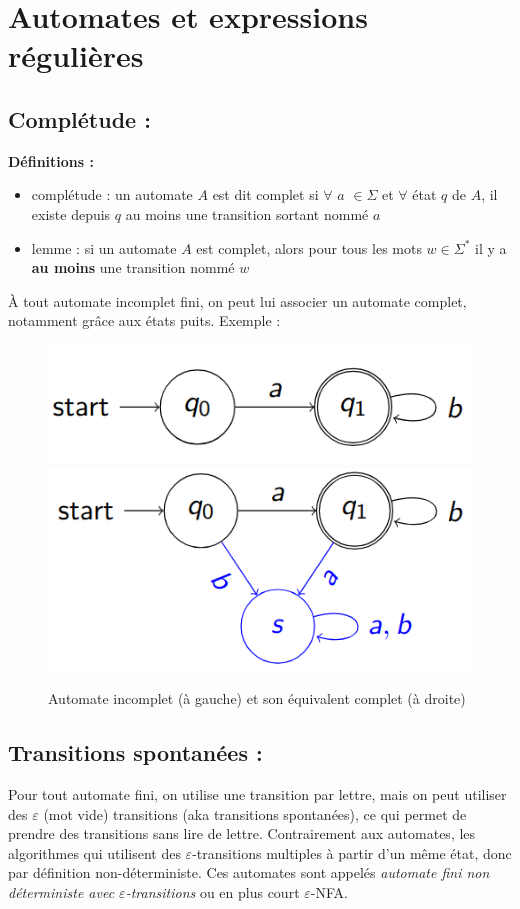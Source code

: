 \documentclass{article}
\begin{document}
\section{Automates et expressions régulières}
\subsection{Complétude :}
\textbf{Définitions :}
\begin{itemize}
    \item complétude : un automate $A$ est dit complet si $\forall$ $a$ $\in \Sigma$ et $\forall$ état $q$ de $A$, il existe depuis $q$ au moins une transition sortant nommé $a$
    \item lemme : si un automate $A$ est complet, alors pour tous les mots $w \in \Sigma^{*}$ il y a \textbf{au moins} une transition nommé $w$
\end{itemize}

À tout automate incomplet fini, on peut lui associer un automate complet, notamment grâce aux états puits. Exemple :
\begin{figure}[h]
    \centering
    \includegraphics[scale=0.3]{uncomplete_automaton.png}
    \includegraphics[scale=0.3]{complete_automaton.png}
    \caption{Automate incomplet (à gauche) et son équivalent complet (à droite)}   
\end{figure}

\subsection{Transitions spontanées :}
Pour tout automate fini, on utilise une transition par lettre, mais on peut utiliser des $\varepsilon$ (mot vide) transitions (aka transitions spontanées), ce qui permet de prendre des transitions sans lire de lettre.\newline
Contrairement aux automates, les algorithmes qui utilisent des $\varepsilon$-transitions multiples à partir d'un même état, donc par définition non-déterministe. Ces automates sont appelés \textit{automate fini non déterministe avec $\varepsilon$-transitions} ou en plus court $\varepsilon$-NFA.\newline
\end{document}
